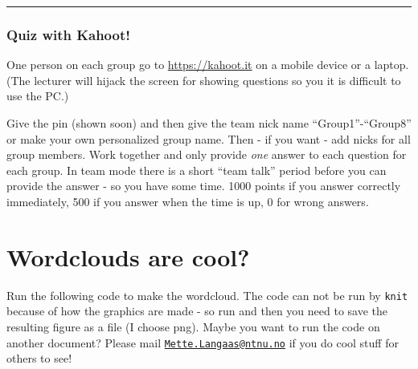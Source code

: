 \documentclass[
]{article}
\begin{document}
\begin{center}\rule{0.5\linewidth}{0.5pt}\end{center}

\hypertarget{quiz-with-kahoot}{%
\subsubsection{Quiz with Kahoot!}\label{quiz-with-kahoot}}

One person on each group go to \url{https://kahoot.it} on a mobile
device or a laptop. (The lecturer will hijack the screen for showing
questions so you it is difficult to use the PC.)

Give the pin (shown soon) and then give the team nick name
``Group1''-``Group8'' or make your own personalized group name. Then -
if you want - add nicks for all group members. Work together and only
provide \emph{one} answer to each question for each group. In team mode
there is a short ``team talk'' period before you can provide the answer
- so you have some time. 1000 points if you answer correctly
immediately, 500 if you answer when the time is up, 0 for wrong answers.

\hypertarget{wordclouds-are-cool}{%
\section{Wordclouds are cool?}\label{wordclouds-are-cool}}

Run the following code to make the wordcloud. The code can not be run by
\texttt{knit} because of how the graphics are made - so run and then you
need to save the resulting figure as a file (I choose png). Maybe you
want to run the code on another document? Please mail
\href{mailto:Mette.Langaas@ntnu.no}{\nolinkurl{Mette.Langaas@ntnu.no}}
if you do cool stuff for others to see!
\end{document}
